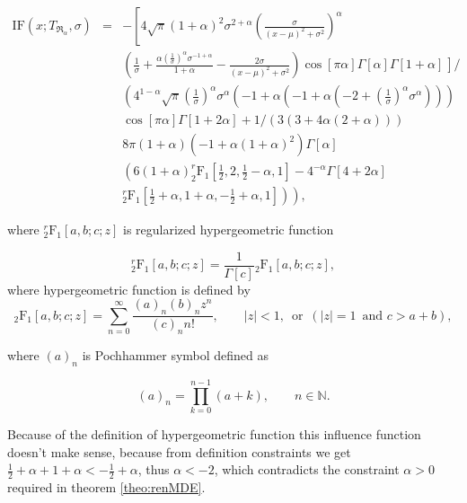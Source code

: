 \begin{eqnarray}
\mathrm{IF}(x;T_{\mathfrak{R}_\alpha},\sigma) &=& -\left[4 \sqrt{\pi } (1+\alpha )^2 \sigma ^{2+\alpha } \left(\frac{\sigma }{(x-\mu )^2+\sigma ^2}\right)^{\alpha} \right. \nonumber\\
&&\left(\frac{1}{\sigma }+\frac{\alpha  \left(\frac{1}{\sigma }\right)^{\alpha } \sigma ^{-1+\alpha }}{1+\alpha }-\frac{2 \sigma }{(x-\mu )^2+\sigma ^2}\right) \left. \cos[\pi  \alpha ] \Gamma[\alpha ] \Gamma[1+\alpha ]  \frac{}{} \right] / \nonumber \\ %
&&\left(4^{1-\alpha } \sqrt{\pi } \left(\frac{1}{\sigma }\right)^{\alpha } \sigma ^{\alpha } \left(-1+\alpha  \left(-1+\alpha  \left(-2+\left(\frac{1}{\sigma }\right)^{\alpha } \sigma ^{\alpha }\right)\right)\right) \right.\nonumber \\ 
&&\left. \cos[\pi  \alpha ] \Gamma[1+2 \alpha ]+1/(3 (3+4 \alpha  (2+\alpha )))\right. \nonumber \\
&& 8 \pi  (1+\alpha ) \left(-1+\alpha  (1+\alpha )^2\right) \Gamma[\alpha ] \nonumber \\
&& \left(6 (1+\alpha ) ^r_2\mathrm{F}_1\left[\frac{1}{2},2,\frac{1}{2}-\alpha ,1\right]-4^{-\alpha } \Gamma[4+2 \alpha ] \right. \nonumber \\
&& \left. \left. ^r_2\mathrm{F}_1\left[\frac{1}{2}+\alpha ,1+\alpha ,-\frac{1}{2}+\alpha ,1\right]\right)\right),
\end{eqnarray}

\noindent where $^r_2\mathrm{F}_1[a,b;c;z]$ is regularized hypergeometric function

\begin{equation}
	^r_2\mathrm{F}_1[a,b;c;z] = {\frac{1}{\Gamma[c]}} {_2\mathrm{F}_1}[a,b;c;z],
\end{equation}
where hypergeometric function is defined by
\begin{equation}
	{_2\mathrm{F}_1}[a,b;c;z]=\sum _{n=0}^{\infty } \frac{(a)_n (b)_n z^n}{ (c)_n n!}, \qquad |z|<1, \, \text{ or } \, (|z|=1  \, \text{ and} \,\,  c>a+b),
\end{equation}

\noindent where $(a)_n$ is Pochhammer symbol defined as

\begin{equation}
(a)_n=\prod _{k=0}^{n-1} (a+k), \qquad n \in \mathbb{N}.
\end{equation}

\noindent Because of the definition of hypergeometric function this influence function doesn't make sense, because from definition constraints we get $\frac{1}{2}+\alpha  + 1+\alpha < -\frac{1}{2}+\alpha $, thus  $\alpha < -2$, which contradicts the constraint  $\alpha>0$ required in theorem \ref{theo:renMDE}. 

